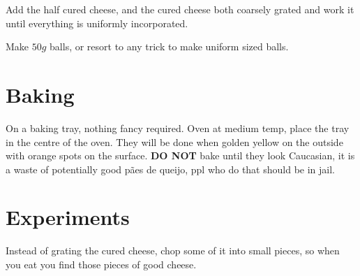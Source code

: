 Add the half cured cheese, and the cured cheese both coarsely grated and work it until everything is uniformly incorporated.

Make $50 g$ balls, or resort to any trick to make uniform sized balls.


\section{Baking}

On a baking tray, nothing fancy required. Oven at medium temp, place the tray in the centre of the oven.
%
They will be done when golden yellow on the outside with orange spots on the surface.
%
\textbf{DO NOT} bake until they look Caucasian, it is a waste of potentially good pães de queijo, ppl who do that should be in jail.

\section{Experiments}

Instead of grating the cured cheese, chop some of it into small pieces, so when you eat you find those pieces of good cheese.



